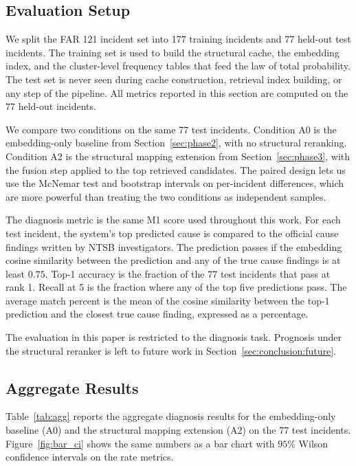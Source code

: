 \documentclass[11pt]{article}
\begin{document}
\subsection{Evaluation Setup}
\label{sec:verify_phase3:setup}

We split the FAR 121 incident set into 177 training incidents and 77 held-out test incidents. The training set is used to build the structural cache, the embedding index, and the cluster-level frequency tables that feed the law of total probability. The test set is never seen during cache construction, retrieval index building, or any step of the pipeline. All metrics reported in this section are computed on the 77 held-out incidents.

We compare two conditions on the same 77 test incidents. Condition A0 is the embedding-only baseline from Section~\ref{sec:phase2}, with no structural reranking. Condition A2 is the structural mapping extension from Section~\ref{sec:phase3}, with the fusion step applied to the top retrieved candidates. The paired design lets us use the McNemar test and bootstrap intervals on per-incident differences, which are more powerful than treating the two conditions as independent samples.

The diagnosis metric is the same M1 score used throughout this work. For each test incident, the system's top predicted cause is compared to the official cause findings written by NTSB investigators. The prediction passes if the embedding cosine similarity between the prediction and any of the true cause findings is at least $0.75$. Top-1 accuracy is the fraction of the 77 test incidents that pass at rank 1. Recall at 5 is the fraction where any of the top five predictions pass. The average match percent is the mean of the cosine similarity between the top-1 prediction and the closest true cause finding, expressed as a percentage.

The evaluation in this paper is restricted to the diagnosis task. Prognosis under the structural reranker is left to future work in Section~\ref{sec:conclusion:future}.

\subsection{Aggregate Results}
\label{sec:verify_phase3:results}

Table~\ref{tab:agg} reports the aggregate diagnosis results for the embedding-only baseline (A0) and the structural mapping extension (A2) on the 77 test incidents. Figure~\ref{fig:bar_ci} shows the same numbers as a bar chart with $95\%$ Wilson confidence intervals on the rate metrics.
\end{document}
